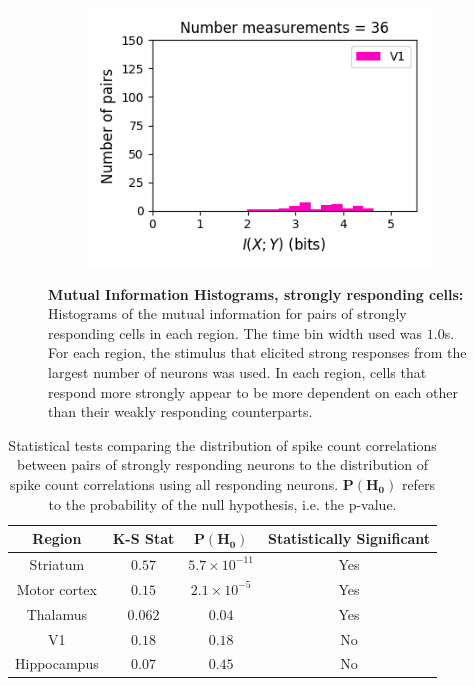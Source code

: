\documentclass[a4paper,12pt]{article}
\theoremstyle{definition}
\begin{document}
\begin{figure}[p]
\begin{subfigure}{0.5\textwidth}
    \includegraphics[width=\textwidth]{figures/strong_v1_6_1p0_information_histogram.png}
  \end{subfigure}
  \caption{\textbf{Mutual Information Histograms, strongly responding cells:} Histograms of the mutual information for pairs of strongly responding cells in each region. The time bin width used was $1.0$s. For each region, the stimulus that elicited strong responses from the largest number of neurons was used. In each region, cells that respond more strongly appear to be more dependent on each other than their weakly responding counterparts.}
  \label{fig:strong_info_histograms}
\end{figure}

\begin{table}[ht!]
  \begin{center}
    \caption{Statistical tests comparing the distribution of spike count correlations between pairs of strongly responding neurons to the distribution of spike count correlations using all responding neurons. $\mathbf{P(H_0)}$ refers to the probability of the null hypothesis, i.e. the p-value.}
    \label{tab:strong_corr_ks_test}
    \begin{tabular}{c|c|c|c} %
      \textbf{Region} & \textbf{K-S Stat} & $\mathbf{P(H_0)}$ & \textbf{Statistically Significant}\\
      \hline
      Striatum      & $0.57$    & $5.7 \times 10^{-11}$   & Yes \\
      Motor cortex  & $0.15$    & $2.1 \times 10^{-5}$    & Yes \\
      Thalamus      & $0.062$   & $0.04$                  & Yes \\
      V1            & $0.18$    & $0.18$                  & No \\
      Hippocampus   & $0.07$    & $0.45$                  & No \\
    \end{tabular}
  \end{center}
\end{table}
\end{document}
